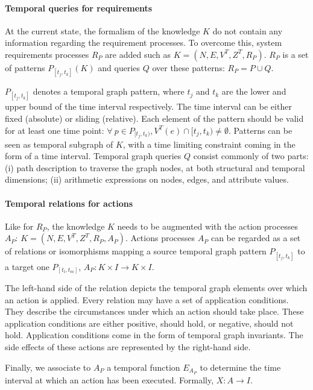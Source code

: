 \paragraph{Temporal queries for requirements}
At the current state, the formalism of the knowledge $K$ do not contain any information regarding the requirement processes.
To overcome this, system requirements processes $R_P$ are added such as $K = (N, E, V^T, Z^T, R_P)$.
$R_P$ is a set of patterns $P_{[t_j,t_k]}(K)$ and queries $Q$ over these patterns: $R_P = {P \cup Q}$. 

$P_{[t_j, t_k]}$ denotes a temporal graph pattern, where $t_j$ and $t_k$ are the lower and upper bound of the time interval respectively.
The time interval can be either fixed (absolute) or sliding (relative).
Each element of the pattern should be valid for at least one time point: $\forall~p \in P_{[t_j,t_k)}, V^T(e) \cap [t_j,t_k) \neq \emptyset$.
Patterns can be seen as temporal subgraph of $K$, with a time limiting constraint coming in the form of a time interval.
Temporal graph queries $Q$ consist commonly of two parts: (i) path description to traverse the graph nodes, at both structural and temporal dimensions; (ii) arithmetic expressions on nodes, edges, and attribute values.    

\paragraph{Temporal relations for actions}
Like for $R_P$, the knowledge $K$ needs to be augmented with the action processes $A_P$: $K = (N, E, V^T, Z^T, R_P, A_P)$.
Actions processes $A_P$ can be regarded as  a set of relations or isomorphisms mapping a source temporal graph pattern $P_{[t_j, t_k]}$ to a target one $P_{[t_l, t_m]}$,  $A_P : K \times I \rightarrow K \times I$.

The left-hand side of the relation depicts the temporal graph elements over which an action is applied.
Every relation may have a set of application conditions. 
They describe the circumstances under which an action should take place. 
These application conditions are either positive, should hold, or negative, should not hold. 
Application conditions come in the form of temporal graph  invariants.  
The side effects of these actions are represented by the right-hand side. 

Finally, we associate to $A_P$ a temporal function $E_{A_P}$ to determine the time interval at which an action has been executed. 
Formally, $X: A \rightarrow I$.

